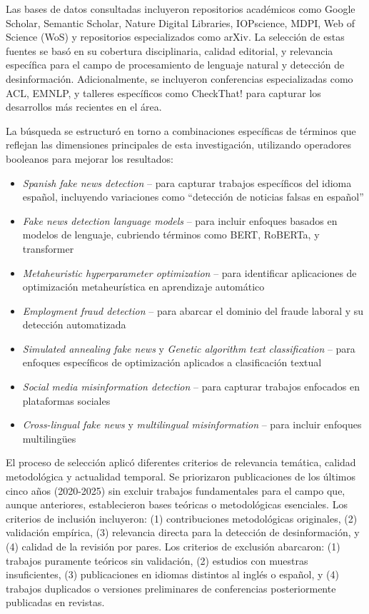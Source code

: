 Las bases de datos consultadas incluyeron repositorios académicos como Google Scholar, Semantic Scholar, Nature Digital Libraries, IOPscience, MDPI, Web of Science (WoS) y repositorios especializados como arXiv. La selección de estas fuentes se basó en su cobertura disciplinaria, calidad editorial, y relevancia específica para el campo de procesamiento de lenguaje natural y detección de desinformación. Adicionalmente, se incluyeron conferencias especializadas como ACL, EMNLP, y talleres específicos como CheckThat! para capturar los desarrollos más recientes en el área.

La búsqueda se estructuró en torno a combinaciones específicas de términos que reflejan las dimensiones principales de esta investigación, utilizando operadores booleanos para mejorar los resultados:

\begin{itemize}
    \item \textit{Spanish fake news detection} -- para capturar trabajos específicos del idioma español, incluyendo variaciones como ``detección de noticias falsas en español''
    \item \textit{Fake news detection language models} -- para incluir enfoques basados en modelos de lenguaje, cubriendo términos como BERT, RoBERTa, y transformer
    \item \textit{Metaheuristic hyperparameter optimization} -- para identificar aplicaciones de optimización metaheurística en aprendizaje automático
    \item \textit{Employment fraud detection} -- para abarcar el dominio del fraude laboral y su detección automatizada
    \item \textit{Simulated annealing fake news} y \textit{Genetic algorithm text classification} -- para enfoques específicos de optimización aplicados a clasificación textual
    \item \textit{Social media misinformation detection} -- para capturar trabajos enfocados en plataformas sociales
    \item \textit{Cross-lingual fake news} y \textit{multilingual misinformation} -- para incluir enfoques multilingües
\end{itemize}

El proceso de selección aplicó diferentes criterios de relevancia temática, calidad metodológica y actualidad temporal. Se priorizaron publicaciones de los últimos cinco años (2020-2025) sin excluir trabajos fundamentales para el campo que, aunque anteriores, establecieron bases teóricas o metodológicas esenciales. Los criterios de inclusión incluyeron: (1) contribuciones metodológicas originales, (2) validación empírica, (3) relevancia directa para la detección de desinformación, y (4) calidad de la revisión por pares. Los criterios de exclusión abarcaron: (1) trabajos puramente teóricos sin validación, (2) estudios con muestras insuficientes, (3) publicaciones en idiomas distintos al inglés o español, y (4) trabajos duplicados o versiones preliminares de conferencias posteriormente publicadas en revistas.

